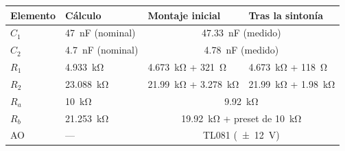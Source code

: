 \begin{tabular}{@{}llll@{}}
\toprule
Elemento & Cálculo & Montaje inicial & Tras la sintonía \\
\midrule
$C_1$ & \qty{47}{\nano\farad} (nominal) & \multicolumn{2}{c}{\qty{47.33}{\nano\farad} (medido)} \\
$C_2$ & \qty{4.7}{\nano\farad} (nominal) & \multicolumn{2}{c}{\qty{4.78}{\nano\farad} (medido)} \\
$R_1$ & \qty{4.933}{\kilo\ohm} & \qty{4.673}{\kilo\ohm} + \qty{321}{\ohm} & \qty{4.673}{\kilo\ohm} + \qty{118}{\ohm} \\
$R_2$ & \qty{23.088}{\kilo\ohm} & \qty{21.99}{\kilo\ohm} + \qty{3.278}{\kilo\ohm} & \qty{21.99}{\kilo\ohm} + \qty{1.98}{\kilo\ohm} \\
$R_a$ & \qty{10}{\kilo\ohm} & \multicolumn{2}{c}{\qty{9.92}{\kilo\ohm}} \\
$R_b$ & \qty{21.253}{\kilo\ohm} & \multicolumn{2}{c}{\qty{19.92}{\kilo\ohm} + preset de \qty{10}{\kilo\ohm}} \\
AO & --- & \multicolumn{2}{c}{TL081 (\qty{\pm 12}{\volt})} \\
\bottomrule
\end{tabular}
